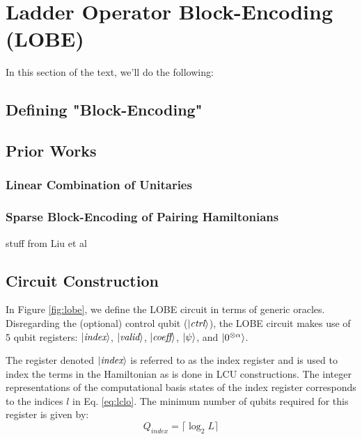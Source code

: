 \section{Ladder Operator Block-Encoding (LOBE)}
\label{sec:lobe}

In this section of the text, we'll do the following:
\subsection{Defining "Block-Encoding"}
\label{subsec:block-encoding}

\subsection{Prior Works}
\label{subsec:prior-works}

\subsubsection{Linear Combination of Unitaries}

\subsubsection{Sparse Block-Encoding of Pairing Hamiltonians}
stuff from Liu et al

\subsection{Circuit Construction}
\label{subsec:circuit}

In Figure \ref{fig:lobe}, we define the LOBE circuit in terms of generic oracles.
Disregarding the (optional) control qubit ($\ket{\textit{ctrl}}$), the LOBE circuit makes use of 5 qubit registers: $\ket{\textit{index}}$, $\ket{\textit{valid}}$, $\ket{\textit{coeff}}$, $\ket{\psi}$, and $\ket{0^{\otimes \alpha}}$.

The register denoted $\ket{\textit{index}}$ is referred to as the index register and is used to index the terms in the Hamiltonian as is done in LCU constructions. 
The integer representations of the computational basis states of the index register corresponds to the indices $l$ in Eq. \ref{eq:lclo}. 
The minimum number of qubits required for this register is given by:
\begin{equation}
    Q_{\textit{index}} = \lceil \log_2{L} \rceil
\end{equation}

